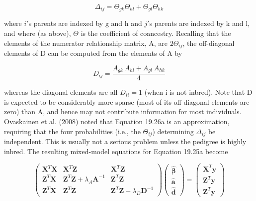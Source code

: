 \documentclass{article}
\begin{document}
\begin{equation}
\Delta_{i j}=\Theta_{g k}\Theta_{h l}+\Theta_{g l}\Theta_{h k}
\tag{19.26a}
\label{eq:19_26a}
\end{equation}

where  $ i' $s parents are indexed by g and h and  $ j' $s parents are indexed by k and l, and where (as above),  $ \Theta $ is the coefficient of coancestry. Recalling that the elements of the numerator relationship matrix, A, are  $ 2\Theta_{ij} $, the off-diagonal elements of D can be computed from the elements of A by

\begin{equation}
D_{ij}=\frac{A_{gk}\ A_{hl}+A_{gl}\ A_{hk}}{4}
\tag{19.26b}
\label{eq:19_26b}
\end{equation}

whereas the diagonal elements are all  $ D_{ii} = 1 $ (when i is not inbred). Note that D is expected to be considerably more sparse (most of its off-diagonal elements are zero) than A, and hence may not contribute information for most individuals. Ovaskainen et al. (2008) noted that Equation 19.26a is an approximation, requiring that the four probabilities (i.e., the  $ \Theta_{ij} $) determining  $ \Delta_{ij} $ be independent. This is usually not a serious problem unless the pedigree is highly inbred. The resulting mixed-model equations for Equation 19.25a become

\begin{equation}
\begin{pmatrix}\mathbf{X}^{T}\mathbf{X}&\mathbf{X}^{T}\mathbf{Z}&\mathbf{X}^{T}\mathbf{Z}\\\mathbf{Z}^{T}\mathbf{X}&\mathbf{Z}^{T}\mathbf{Z}+\lambda_{A}\mathbf{A}^{-1}&\mathbf{Z}^{T}\mathbf{Z}\\\mathbf{Z}^{T}\mathbf{X}&\mathbf{Z}^{T}\mathbf{Z}&\mathbf{Z}^{T}\mathbf{Z}+\lambda_{D}\mathbf{D}^{-1}\end{pmatrix}\begin{pmatrix}\widehat{\boldsymbol{\beta}}\\\widehat{\mathbf{a}}\\\widehat{\mathbf{d}}\end{pmatrix}=\begin{pmatrix}\mathbf{X}^{T}\mathbf{y}\\\mathbf{Z}^{T}\mathbf{y}\\\mathbf{Z}^{T}\mathbf{y}\end{pmatrix}
\tag{19.27}
\label{eq:19_27}
\end{equation}
\end{document}
